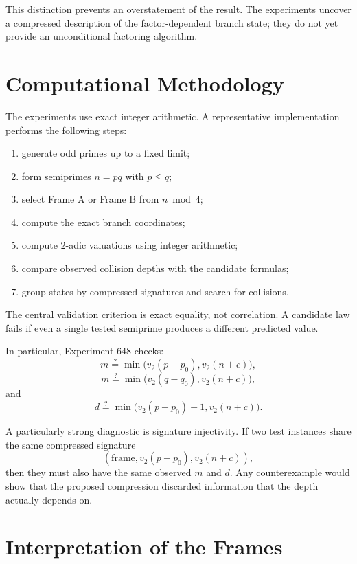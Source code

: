 \documentclass[11pt,a4paper]{article}
\newcommand{\vTwo}{v_2}
\begin{document}
This distinction prevents an overstatement of the result. The experiments uncover a compressed description of the factor-dependent branch state; they do not yet provide an unconditional factoring algorithm.

\section{Computational Methodology}

The experiments use exact integer arithmetic. A representative implementation performs the following steps:

\begin{enumerate}[leftmargin=2em]
    \item generate odd primes up to a fixed limit;
    \item form semiprimes $n=pq$ with $p\le q$;
    \item select Frame A or Frame B from $n\bmod4$;
    \item compute the exact branch coordinates;
    \item compute $2$-adic valuations using integer arithmetic;
    \item compare observed collision depths with the candidate formulas;
    \item group states by compressed signatures and search for collisions.
\end{enumerate}

The central validation criterion is exact equality, not correlation. A candidate law fails if even a single tested semiprime produces a different predicted value.

In particular, Experiment 648 checks:
\[
    m
    \stackrel{?}{=}
    \min\bigl(\vTwo(p-p_0),\vTwo(n+c)\bigr),
\]
\[
    m
    \stackrel{?}{=}
    \min\bigl(\vTwo(q-q_0),\vTwo(n+c)\bigr),
\]
and
\[
    d
    \stackrel{?}{=}
    \min\bigl(\vTwo(p-p_0)+1,\vTwo(n+c)\bigr).
\]

A particularly strong diagnostic is signature injectivity. If two test instances share the same compressed signature
\[
    (\text{frame},\vTwo(p-p_0),\vTwo(n+c)),
\]
then they must also have the same observed $m$ and $d$. Any counterexample would show that the proposed compression discarded information that the depth actually depends on.

\section{Interpretation of the Frames}
\end{document}
